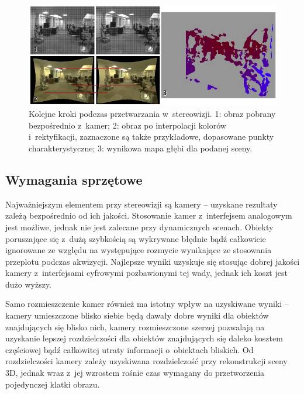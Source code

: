 \begin{figure}[h!]
\centering
\includegraphics[width=15cm]{../../Common/img/stereo_steps}
\caption[Kolejne kroki podczas przetwarzania w~stereowizji]
{Kolejne kroki podczas przetwarzania w~stereowizji. 1: obraz pobrany
bezpośrednio z~kamer; 2: obraz po interpolacji kolorów i~rektyfikacji,
zaznaczone są także przykładowe, dopasowane punkty charakterystyczne; 3:
wynikowa mapa głębi dla podanej sceny.}
\label{fig:stereo_steps}
\end{figure}

\subsection{Wymagania sprzętowe}

Najważniejszym elementem przy stereowizji są kamery -- uzyskane rezultaty zależą
bezpośrednio od ich jakości. Stosowanie kamer z~interfejsem analogowym jest
możliwe, jednak nie jest zalecane przy dynamicznych scenach. Obiekty
poruszające się z~dużą szybkością są wykrywane błędnie bądź całkowicie
ignorowane ze względu na występujące rozmycie wynikające ze stosowania
przeplotu podczas akwizycji. Najlepsze wyniki uzyskuje się
stosując dobrej jakości kamery z~interfejsami cyfrowymi pozbawionymi tej wady,
jednak ich koszt jest dużo wyższy.

Samo rozmieszczenie kamer również ma istotny wpływ na uzyskiwane wyniki --
kamery umieszczone blisko siebie będą dawały dobre wyniki dla obiektów
znajdujących się blisko nich, kamery rozmieszczone szerzej pozwalają na
uzyskanie lepszej rozdzielczości dla obiektów znajdujących się daleko kosztem
częściowej bądź całkowitej utraty informacji o~obiektach bliskich. Od
rozdzielczości kamery zależy uzyskiwana rozdzielczość przy rekonstrukcji sceny
3D, jednak wraz z~jej wzrostem rośnie czas wymagany do przetworzenia
pojedynczej klatki obrazu.

